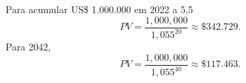 Para acumular US\$ 1.000.000 em 2022 a 5,5%
\[
PV=\frac{1{,}000{,}000}{1{,}055^{20}}\approx\$342.729.
\]
Para 2042,
\[
PV=\frac{1{,}000{,}000}{1{,}055^{40}}\approx\$117.463.
\]